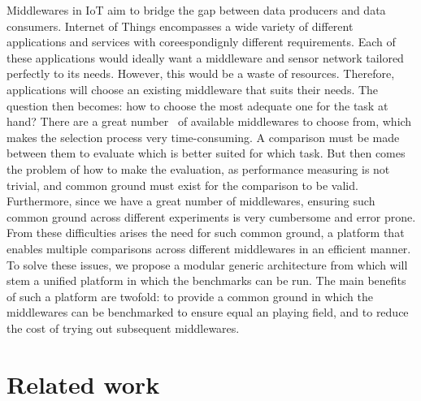 \documentclass[conference]{IEEEtran}
\begin{document}
Middlewares in IoT aim to bridge the gap between data producers and data consumers. Internet of Things encompasses a wide variety of different applications and services with coreespondignly different requirements. Each of these applications would ideally want a middleware and sensor network tailored perfectly to its needs. However, this would be a waste of resources. Therefore, applications will choose an existing middleware that suits their needs. The question then becomes: how to choose the most adequate one for the task at hand? There are a great number~\cite{razzaque_middleware_2016} of available middlewares to choose from, which makes the selection process very time-consuming. A comparison must be made between them to evaluate which is better suited for which task. But then comes the problem of how to make the evaluation, as performance measuring is not trivial, and common ground must exist for the comparison to be valid. Furthermore, since we have a great number of middlewares, ensuring such common ground across different experiments is very cumbersome and error prone. From these difficulties arises the need for such common ground, a platform that enables multiple comparisons across different middlewares in an efficient manner. To solve these issues, we propose a modular generic architecture from which will stem a unified platform in which the benchmarks can be run. The main benefits of such a platform are twofold: to provide a common ground in which the middlewares can be benchmarked to ensure equal an playing field, and to reduce the cost of trying out subsequent middlewares.  


\section{Related work}
\end{document}
